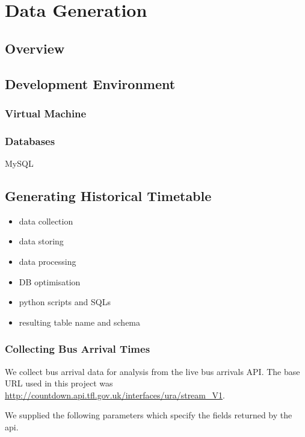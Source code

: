 \chapter{Data Generation}
\section{Overview}


\section{Development Environment}
\subsection{Virtual Machine}

\subsection{Databases}
MySQL


\section{Generating Historical Timetable}
\begin{itemize}
  \item data collection
  \item data storing
  \item data processing
  \item DB optimisation
  \item python scripts and SQLs
  \item resulting table name and schema
\end{itemize}

\subsection{Collecting Bus Arrival Times}
\label{sec:collecting_arrival_times}

\par We collect bus arrival data for analysis from the live bus arrivals API. The base URL used in this project was \url{http://countdown.api.tfl.gov.uk/interfaces/ura/stream_V1}.

\par We supplied the following parameters which specify the fields returned by the \acrshort{api}.

